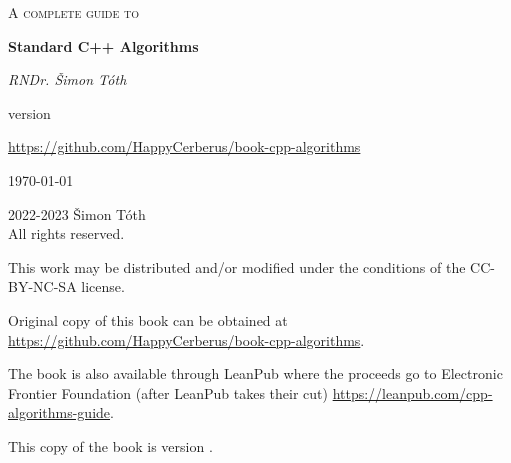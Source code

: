 \begin{titlepage}
	\centering
	\vspace{2cm}
	{\scshape\huge A complete guide to\par}
	\vspace{1.5cm}
	{\huge\bfseries Standard C++ Algorithms\par}
	\vspace{2cm}
	{\Large\itshape RNDr. Šimon Tóth\par}
	\vfill
	version \version\par
	\href{https://github.com/HappyCerberus/book-cpp-algorithms}{https://github.com/HappyCerberus/book-cpp-algorithms}

	\vfill

	{\large \today\par}
\end{titlepage}

\pagestyle{empty}
\begingroup
\footnotesize
\parindent 0pt
\parskip \baselineskip
\vfill
\textcopyright{} 2022-2023 Šimon Tóth \\
All rights reserved.

This work may be distributed and/or modified under the conditions of the CC-BY-NC-SA license.

Original copy of this book can be obtained at \href{https://github.com/HappyCerberus/book-cpp-algorithms}{https://github.com/HappyCerberus/book-cpp-algorithms}.

The book is also available through LeanPub where the proceeds go to Electronic Frontier Foundation (after LeanPub takes their cut) \href{https://leanpub.com/cpp-algorithms-guide}{https://leanpub.com/cpp-algorithms-guide}.

This copy of the book is version \version.

\vfill

\vspace*{2\baselineskip}


\endgroup
\clearpage
\pagestyle{plain}